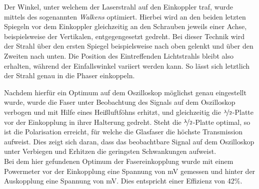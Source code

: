 Der Winkel, unter welchem der Laserstrahl auf den Einkoppler traf, wurde mittels des sogenannten \textit{Walkens} optimiert. Hierbei wird an den beiden letzten Spiegeln vor dem Einkoppler gleichzeitig an den Schrauben jeweils einer Achse, beispielsweise der Vertikalen, entgegengesetzt gedreht. Bei dieser Technik wird der Strahl über den ersten Spiegel beispielsweise nach oben gelenkt und über den Zweiten nach unten. Die Position des Eintreffenden Lichtstrahls bleibt also erhalten, während der Einfallswinkel variiert werden kann. So lässt sich letztlich der Strahl genau in die Phaser einkoppeln.

Nachdem hierfür ein Optimum auf dem Oszilloskop möglichst genau eingestellt wurde, wurde die Faser unter Beobachtung des Signals auf dem Oszilloskop verbogen und mit Hilfe eines Heißluftföhns erhitzt, und gleichzeitig die $\nicefrac{\lambda}{2}$-Platte vor der Einkopplung in ihrer Halterung gedreht. Steht die $\nicefrac{\lambda}{2}$-Platte optimal, so ist die Polarisation erreicht, für welche die Glasfaser die höchste Transmission aufweist. Dies zeigt sich daran, dass das beobachtbare Signal auf dem Oszilloskop unter Verbiegen und Erhitzen die geringsten Schwankungen aufweist. \\
Bei dem hier gefundenen Optimum der Fasereinkopplung wurde mit einem Powermeter vor der Einkopplung eine Spannung von \unit[420]{mV} gemessen und hinter der Auskopplung eine Spannung von \unit[244]{mV}. Dies entspricht einer Effizienz von 42\%. 

